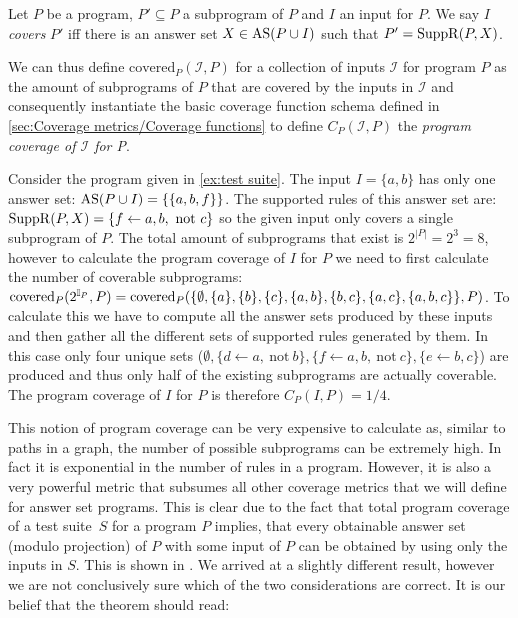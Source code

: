 \begin{definition}
\label{def:program coverage}
    Let $P$ be a program, \(P' \subseteq P\) a subprogram of $P$ and $I$ an input for $P$. We say $I$ \emph{covers} $P'$ iff there is an answer set \(X \in \operatorname{AS}(P \cup I)\) such that \(P' = \operatorname{SuppR}(P, X)\).
\end{definition}

We can thus define \(\text{covered}_P(\mathcal{I}, P)\) for a collection of inputs $\mathcal{I}$ for program $P$ as the amount of subprograms of $P$ that are covered by the inputs in $\mathcal{I}$ and consequently instantiate the basic coverage function schema defined in \cref{sec:Coverage metrics/Coverage functions} to define \(C_P(\mathcal{I}, P)\) the \emph{program coverage of $\mathcal{I}$ for P}.

\begin{example}
\label{ex:program coverage}
    Consider the program given in \cref{ex:test suite}. The input \(I = \{a, b\}\) has only one answer set: \(\operatorname{AS}(P \cup I) = \{\{a, b, f\}\}\). The supported rules of this answer set are: \(\SuppR(P, X) = \{f \leftarrow a, b,\ \text{not}\ c\}\) so the given input only covers a single subprogram of $P$. The total amount of subprograms that exist is \(2^{|P|} = 2^3 = 8\), however to calculate the program coverage of $I$ for $P$ we need to first calculate the number of coverable subprograms: \(\text{covered}_P(2^{\mathbb{I}_P},P) = \text{covered}_P(\{\emptyset, \{a\}, \{b\}, \{c\}, \{a, b\}, \{b, c\}, \{a, c\}, \\ \{a, b, c\}\},P)\). To calculate this we have to compute all the answer sets produced by these inputs and then gather all the different sets of supported rules generated by them. In this case only four unique sets (\(\emptyset, \{d \leftarrow a,\ \text{not}\ b\}, \{f \leftarrow a, b,\ \text{not}\ c\}, \{e \leftarrow b, c\}\)) are produced and thus only half of the existing subprograms are actually coverable. The program coverage of $I$ for $P$ is therefore \(C_P(I, P) = 1/4\).
\end{example}

This notion of program coverage can be very expensive to calculate as, similar to paths in a graph, the number of possible subprograms can be extremely high. In fact it is exponential in the number of rules in a program. However, it is also a very powerful metric that subsumes all other coverage metrics that we will define for answer set programs. This is clear due to the fact that total program coverage of a test suite~$S$ for a program $P$ implies, that every obtainable answer set (modulo projection) of $P$ with some input of $P$ can be obtained by using only the inputs in $S$. This is shown in \cite[Theorem 2]{Jan+10}. We arrived at a slightly different result, however we are not conclusively sure which of the two considerations are correct. It is our belief that the theorem should read:

